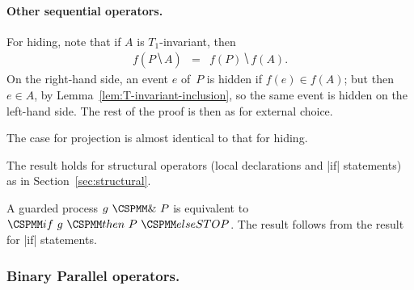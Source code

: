 





\paragraph{Other sequential operators.} 

For hiding, note that if $A$ is $T_1$-invariant, then
\begin{eqnarray*}
f(P \hide A) & = & f(P) \hide f(A).
\end{eqnarray*}
%
On the right-hand side, an event $e$ of~$P$ is hidden if $f(e) \in f(A)$; but
then $e \in A$, by Lemma~\ref{lem:T-invariant-inclusion}, so the same event is
hidden on the left-hand side.  The rest of the proof is then as for external
choice.

The case for projection is almost identical to that for hiding. 

The result holds for structural operators (local declarations and |if|
statements) as in Section~\ref{sec:structural}.

A guarded process $g ~\M{\&}~ P$ is equivalent to $\M{if}~ g ~ \M{then}~
P ~ \M{else STOP}$.  The result follows from the result for |if| statements.


\subsubsection{Binary Parallel operators.}
\label{sec:parallel}

